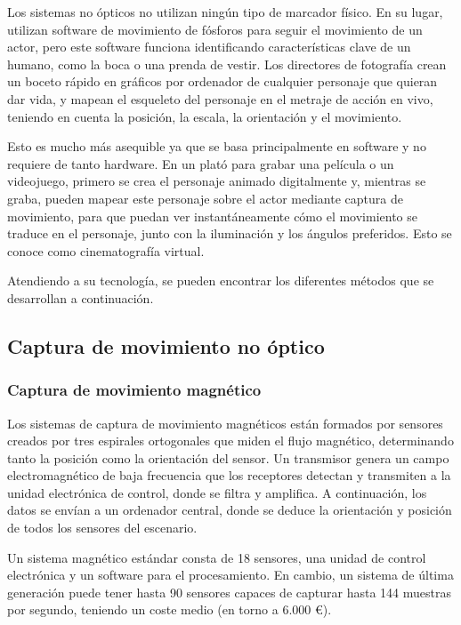 Los sistemas no ópticos no utilizan ningún tipo de marcador físico. En su lugar, utilizan software de movimiento de fósforos para seguir el movimiento de un actor, pero este software funciona identificando características clave de un humano, como la boca o una prenda de vestir. Los directores de fotografía crean un boceto rápido en gráficos por ordenador de cualquier personaje que quieran dar vida, y mapean el esqueleto del personaje en el metraje de acción en vivo, teniendo en cuenta la posición, la escala, la orientación y el movimiento.

Esto es mucho más asequible ya que se basa principalmente en software y no requiere de tanto hardware. En un plató para grabar una película o un videojuego, primero se crea el personaje animado digitalmente y, mientras se graba, pueden mapear este personaje sobre el actor mediante captura de movimiento, para que puedan ver instantáneamente cómo el movimiento se traduce en el personaje, junto con la iluminación y los ángulos preferidos. Esto se conoce como cinematografía virtual.

Atendiendo a su tecnología, se pueden encontrar los diferentes métodos que se desarrollan a continuación.

\subsection{Captura de movimiento no óptico}

\subsubsection{Captura de movimiento magnético}

Los sistemas de captura de movimiento magnéticos están formados por sensores creados por tres espirales ortogonales que miden el flujo magnético, determinando tanto la posición como la orientación del sensor. Un transmisor genera un campo electromagnético de baja frecuencia que los receptores detectan y transmiten a la unidad electrónica de control, donde se filtra y amplifica. A continuación, los datos se envían a un ordenador central, donde se deduce la orientación y posición de todos los sensores del escenario. 

Un sistema magnético estándar consta de 18 sensores, una unidad de control electrónica y un software para el procesamiento. En cambio, un sistema de última generación puede tener hasta 90 sensores capaces de capturar hasta 144 muestras por segundo, teniendo un coste medio (en torno a 6.000 \euro).

